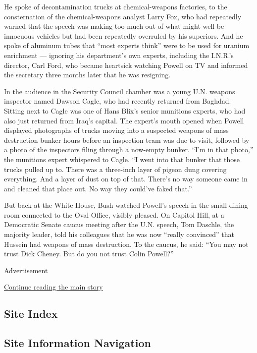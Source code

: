 He spoke of decontamination trucks at chemical-weapons factories, to the
consternation of the chemical-weapons analyst Larry Fox, who had
repeatedly warned that the speech was making too much out of what might
well be innocuous vehicles but had been repeatedly overruled by his
superiors. And he spoke of aluminum tubes that ``most experts think''
were to be used for uranium enrichment --- ignoring his department's own
experts, including the I.N.R.'s director, Carl Ford, who became
heartsick watching Powell on TV and informed the secretary three months
later that he was resigning.

In the audience in the Security Council chamber was a young U.N. weapons
inspector named Dawson Cagle, who had recently returned from Baghdad.
Sitting next to Cagle was one of Hans Blix's senior munitions experts,
who had also just returned from Iraq's capital. The expert's mouth
opened when Powell displayed photographs of trucks moving into a
suspected weapons of mass destruction bunker hours before an inspection
team was due to visit, followed by a photo of the inspectors filing
through a now-empty bunker. ``I'm in that photo,'' the munitions expert
whispered to Cagle. ``I went into that bunker that those trucks pulled
up to. There was a three-inch layer of pigeon dung covering everything.
And a layer of dust on top of that. There's no way someone came in and
cleaned that place out. No way they could've faked that.''

But back at the White House, Bush watched Powell's speech in the small
dining room connected to the Oval Office, visibly pleased. On Capitol
Hill, at a Democratic Senate caucus meeting after the U.N. speech, Tom
Daschle, the majority leader, told his colleagues that he was now
``really convinced'' that Hussein had weapons of mass destruction. To
the caucus, he said: ``You may not trust Dick Cheney. But do you not
trust Colin Powell?''

Advertisement

\protect\hyperlink{after-bottom}{Continue reading the main story}

\hypertarget{site-index}{%
\subsection{Site Index}\label{site-index}}

\hypertarget{site-information-navigation}{%
\subsection{Site Information
Navigation}\label{site-information-navigation}}

